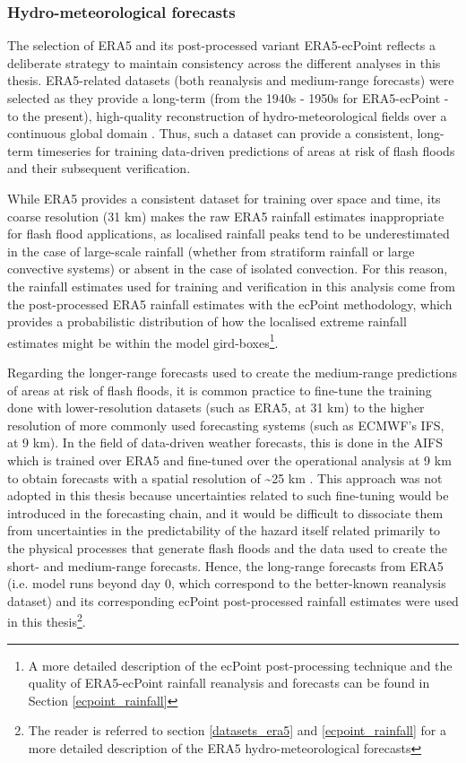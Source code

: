\subsubsection{Hydro-meteorological forecasts}

The selection of ERA5 and its post-processed variant ERA5-ecPoint reflects a deliberate strategy to maintain consistency across the different analyses in this thesis. ERA5-related datasets (both reanalysis and medium-range forecasts) were selected as they provide a long-term (from the 1940s - 1950s for ERA5-ecPoint - to the present), high-quality reconstruction of hydro-meteorological fields over a continuous global domain \citep{Hersbach_2020}. Thus, such a dataset can provide a consistent, long-term timeseries for training data-driven predictions of areas at risk of flash floods and their subsequent verification.

While ERA5 provides a consistent dataset for training over space and time, its coarse resolution (31 km) makes the raw ERA5 rainfall estimates inappropriate for flash flood applications, as localised rainfall peaks tend to be underestimated in the case of large-scale rainfall (whether from stratiform rainfall or large convective systems) or absent in the case of isolated convection. For this reason, the rainfall estimates used for training and verification in this analysis come from the post-processed ERA5 rainfall estimates with the ecPoint methodology, which provides a probabilistic distribution of how the localised extreme rainfall estimates might be within the model gird-boxes\footnote{A more detailed description of the ecPoint post-processing technique and the quality of ERA5-ecPoint rainfall reanalysis and forecasts can be found in Section \ref{ecpoint_rainfall}}.

Regarding the longer-range forecasts used to create the medium-range predictions of areas at risk of flash floods, it is common practice to fine-tune the training done with lower-resolution datasets (such as ERA5, at 31 km) to the higher resolution of more commonly used forecasting systems (such as ECMWF's IFS, at 9 km). In the field of data-driven weather forecasts, this is done in the AIFS which is trained over ERA5 and fine-tuned over the operational analysis at 9 km to obtain forecasts with a spatial resolution of \sim25 km  \citep{Lang_2024}. This approach was not adopted in this thesis because uncertainties related to such fine-tuning would be introduced in the forecasting chain, and it would be difficult to dissociate them from uncertainties in the predictability of the hazard itself related primarily to the physical processes that generate flash floods and the data used to create the short- and medium-range forecasts. Hence, the long-range forecasts from ERA5 (i.e. model runs beyond day 0, which correspond to the better-known reanalysis dataset) and its corresponding ecPoint post-processed rainfall estimates were used in this thesis\footnote{The reader is referred to section \ref{datasets_era5} and \ref{ecpoint_rainfall} for a more detailed description of the ERA5 hydro-meteorological forecasts}. 

